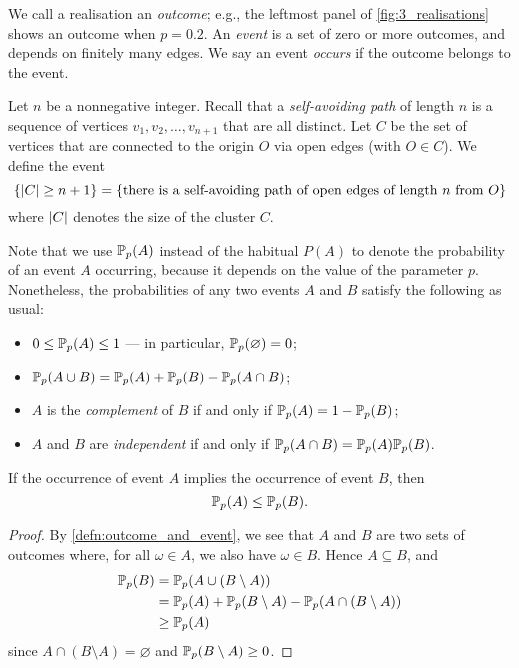 \documentclass[a4paper, 12pt]{article}
\begin{document}
\begin{defn}\label{defn:outcome_and_event}
We call a realisation an \textit{outcome}; e.g., the leftmost panel of \cref{fig:3_realisations} shows an outcome when $p = 0.2$. An \textit{event} is a set of zero or more outcomes, and depends on finitely many edges. We say an event \textit{occurs} if the outcome belongs to the event.
\end{defn}

\begin{ex}\label{ex:cluster_of_size_n}
Let $n$ be a nonnegative integer. Recall that a \textit{self-avoiding path} of length $n$ is a sequence of vertices $v_1, v_2, \dots, v_{n + 1}$ that are all distinct.
Let $C$ be the set of vertices that are connected to the origin $O$ via open edges (with $O \in C$). We define the event
\[
\{\lvert C \rvert \geq n + 1\}
= \{\text{there is a self-avoiding path of open edges of length } n \text{ from } O\}
\]
where $\lvert C \rvert$ denotes the size of the cluster $C$.

\end{ex}

Note that we use $\mathbb{P}_p(A)$ instead of the habitual $P(A)$ to denote the probability of an event $A$ occurring, because it depends on the value of the parameter $p$. Nonetheless, the probabilities of any two events $A$ and $B$ satisfy the following as usual:
\begin{itemize}
    \item $0 \leq \mathbb{P}_p(A) \leq 1$ --- in particular, $\mathbb{P}_p(\varnothing) = 0$;
    \item $\mathbb{P}_p(A \cup B) = \mathbb{P}_p(A) + \mathbb{P}_p(B) - \mathbb{P}_p(A \cap B)$;
    \item $A$ is the \textit{complement} of $B$ if and only if $\mathbb{P}_p(A) = 1 - \mathbb{P}_p(B)$;
    \item $A$ and $B$ are \textit{independent} if and only if $\mathbb{P}_p(A \cap B) = \mathbb{P}_p(A) \mathbb{P}_p(B)$.
\end{itemize}

\begin{lem}[Monotonicity]\label{lem:event_subseteq}
If the occurrence of event $A$ implies the occurrence of event $B$, then $$\mathbb{P}_p(A) \leq \mathbb{P}_p(B).$$
\end{lem}
\begin{proof}
By \cref{defn:outcome_and_event}, we see that $A$ and $B$ are two sets of outcomes where, for all $\omega \in A$, we also have $\omega \in B$. Hence $A \subseteq B$, and 
\begin{align*}
    \mathbb{P}_p(B) 
    &= \mathbb{P}_p(A \cup (B \setminus A))\\
    &= \mathbb{P}_p(A) + \mathbb{P}_p(B \setminus A) - \mathbb{P}_p(A \cap (B \setminus A))\\
    &\geq \mathbb{P}_p(A)
\end{align*}
since $A \cap (B \setminus A) = \varnothing$ and $\mathbb{P}_p(B \setminus A) \geq 0$.

%        
\end{proof}
\end{document}
